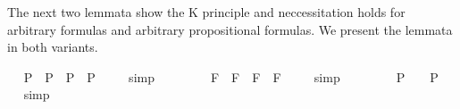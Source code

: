 \begin{isabellebody}
%
\endisatagproof
{\isafoldproof}%
%
\isadelimproof
%
\endisadelimproof
%
\isamarkuptrue%
%
\begin{isamarkuptext}%
The next two lemmata show the K principle  and neccessitation holds for arbitrary formulas 
  and arbitrary propositional formulas. We present the lemmata in both variants.%
\end{isamarkuptext}%
\isamarkuptrue%
\ \isamarkupfalse%
\ {\isachardoublequoteopen}{\isacharbrackleft}{\isacharparenleft}\isactrlbold {\isasymbox}{\isacharparenleft}{\isasymphi}\isactrlsup P\ \isactrlbold {\isasymrightarrow}\ {\isasymphi}\isactrlsup P{\isacharparenright}{\isacharparenright}\ \isactrlbold {\isasymrightarrow}\ {\isacharparenleft}\isactrlbold {\isasymbox}{\isasymphi}\isactrlsup P\ \isactrlbold {\isasymrightarrow}\ \isactrlbold {\isasymbox}{\isasymphi}\isactrlsup P{\isacharparenright}{\isacharbrackright}\ {\isacharequal}\ {\isasymtop}{\isachardoublequoteclose}%
\isadelimproof
\ %
\endisadelimproof
%
\isatagproof
{}\isamarkupfalse%
\ simp\ \isamarkupfalse%
\ \ \ \ %
%
\endisatagproof
{\isafoldproof}%
%
\isadelimproof
%
\endisadelimproof
\isanewline
\ \isamarkupfalse%
\ {\isachardoublequoteopen}{\isacharbrackleft}{\isacharparenleft}\isactrlbold {\isasymbox}{\isacharparenleft}{\isasymphi}\isactrlsup F\ \isactrlbold {\isasymrightarrow}\ {\isasymphi}\isactrlsup F{\isacharparenright}{\isacharparenright}\ \isactrlbold {\isasymrightarrow}\ {\isacharparenleft}\isactrlbold {\isasymbox}{\isasymphi}\isactrlsup F\ \isactrlbold {\isasymrightarrow}\ \isactrlbold {\isasymbox}{\isasymphi}\isactrlsup F{\isacharparenright}{\isacharbrackright}\ {\isacharequal}\ {\isasymtop}{\isachardoublequoteclose}%
\isadelimproof
\ %
\endisadelimproof
%
\isatagproof
{}\isamarkupfalse%
\ simp\ \isamarkupfalse%
\ \ \ \ %
%
\endisatagproof
{\isafoldproof}%
%
\isadelimproof
%
\endisadelimproof
\isanewline
\isanewline
\ \isamarkupfalse%
\ {\isachardoublequoteopen}{\isacharbrackleft}{\isasymphi}\isactrlsup P{\isacharbrackright}\ {\isacharequal}\ {\isasymtop}\ {\isasymlongrightarrow}\ {\isacharbrackleft}\isactrlbold {\isasymbox}{\isasymphi}\isactrlsup P{\isacharbrackright}\ {\isacharequal}\ {\isasymtop}\ {\isachardoublequoteclose}%
\isadelimproof
\ %
\endisadelimproof
%
\isatagproof
{}\isamarkupfalse%
\ simp\ \isamarkupfalse%
\ \ \ \ %
\end{isabellebody}
